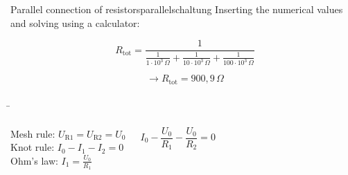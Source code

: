 \begin{frame}
{\begin{expl}{Parallel connection of resistors}{parallelschaltung}
			Inserting the numerical values and solving using a calculator:
			
			\begin{equation*}
				R_\mathrm{tot} = \frac{1}{\frac{1}{1\cdot 10^3 \, \Omega} + \frac{1}{10\cdot 10^3 \, \Omega} + \frac{1}{100 \cdot 10^3 \, \Omega}}
			\end{equation*}
			
			\begin{equation*}
				\rightarrow R_\mathrm{tot} = 900,9 \, \Omega
			\end{equation*}
			
			
			
			
		\end{expl}
		
		
	}
	
	\b{
		\begin{columns}
			
			Mesh rule: $U_\mathrm{R1} = U_\mathrm{R2} = U_0$\\
			
			Knot rule: $I_0 - I_1 - I_2 = 0$\\
			
			Ohm's law: $I_1 = \frac{U_0}{R_1}$ %
			
			
			\begin{equation*}
				I_0 - \frac{U_0}{R_1} - \frac{U_0}{R_2} = 0
			\end{equation*}
			
			
			
			
			
			
			
			
			
			
\end{columns}}
\end{frame}
